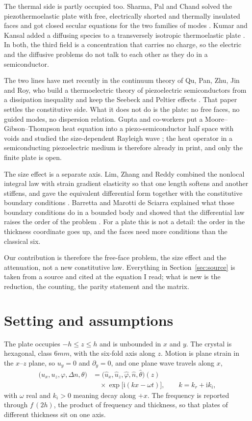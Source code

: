 \documentclass[11pt]{article}
\newcommand{\ii}{\mathrm{i}}
\begin{document}
The thermal side is partly occupied too. Sharma, Pal and Chand solved the piezothermoelastic plate with
free, electrically shorted and thermally insulated faces and got closed secular equations for the two
families of modes \cite{Sharma2004}. Kumar and Kansal added a diffusing species to a transversely
isotropic thermoelastic plate \cite{KumarKansal2008}. In both, the third field is a concentration that
carries no charge, so the electric and the diffusive problems do not talk to each other as they do in a
semiconductor.

The two lines have met recently in the continuum theory of Qu, Pan, Zhu, Jin and Roy, who build a
thermoelectric theory of piezoelectric semiconductors from a dissipation inequality and keep the Seebeck
and Peltier effects \cite{Qu2023}. That paper settles the constitutive side. What it does not do is the
plate: no free faces, no guided modes, no dispersion relation. Gupta and co-workers put a
Moore--Gibson--Thompson heat equation into a piezo-semiconductor half space with voids and studied the
size-dependent Rayleigh wave \cite{Gupta2025}; the heat operator in a semiconducting piezoelectric medium
is therefore already in print, and only the finite plate is open.

The size effect is a separate axis. Lim, Zhang and Reddy combined the nonlocal integral law with strain
gradient elasticity so that one length softens and another stiffens, and gave the equivalent differential
form together with the constitutive boundary conditions \cite{Lim2015}. Barretta and Marotti de Sciarra
explained what those boundary conditions do in a bounded body and showed that the differential law raises
the order of the problem \cite[Eqs.~(18)--(19)]{Barretta2018}. For a plate this is not a detail: the order
in the thickness coordinate goes up, and the faces need more conditions than the classical six.

Our contribution is therefore the free-face problem, the size effect and the attenuation, not a new
constitutive law. Everything in Section~\ref{sec:source} is taken from a source and cited at the equation
I read; what is new is the reduction, the counting, the parity statement and the matrix.

\section{Setting and assumptions}\label{sec:setting}

The plate occupies $-h\le z\le h$ and is unbounded in $x$ and $y$. The crystal is hexagonal, class $6mm$,
with the six-fold axis along $z$. Motion is plane strain in the $x$--$z$ plane, so $u_y=0$ and
$\partial_y=0$, and one plane wave travels along $x$,
\begin{align}
\bigl(u_x,u_z,\varphi,\Delta n,\theta\bigr)
&=\bigl(\hat u_x,\hat u_z,\hat\varphi,\hat n,\hat\theta\bigr)(z)\\
&\quad\times\exp\bigl[\ii(kx-\omega t)\bigr],
\qquad k=k_r+\ii k_i,
\label{eq:ansatz}
\end{align}
with $\omega$ real and $k_i>0$ meaning decay along $+x$. The frequency is reported through $f\,(2h)$, the
product of frequency and thickness, so that plates of different thickness sit on one axis.
\end{document}
